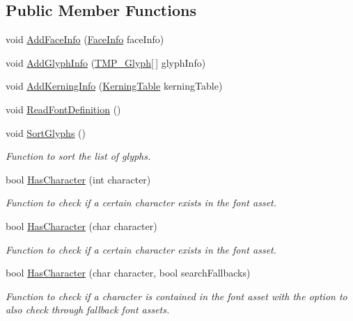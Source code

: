 \subsection*{Public Member Functions}
\begin{DoxyCompactItemize}
\item 
void \mbox{\hyperlink{class_t_m_pro_1_1_t_m_p___font_asset_a8189329802859389f3dd6152b4f9917f}{Add\+Face\+Info}} (\mbox{\hyperlink{class_t_m_pro_1_1_face_info}{Face\+Info}} face\+Info)
\item 
void \mbox{\hyperlink{class_t_m_pro_1_1_t_m_p___font_asset_a6002e55fa6fdd78bbc65dac68e9f9192}{Add\+Glyph\+Info}} (\mbox{\hyperlink{class_t_m_pro_1_1_t_m_p___glyph}{T\+M\+P\+\_\+\+Glyph}}\mbox{[}$\,$\mbox{]} glyph\+Info)
\item 
void \mbox{\hyperlink{class_t_m_pro_1_1_t_m_p___font_asset_a45942ff82434c0e1e07f830b1d0c2af0}{Add\+Kerning\+Info}} (\mbox{\hyperlink{class_t_m_pro_1_1_kerning_table}{Kerning\+Table}} kerning\+Table)
\item 
void \mbox{\hyperlink{class_t_m_pro_1_1_t_m_p___font_asset_aecaed95f724698d0c77f8d38eab90640}{Read\+Font\+Definition}} ()
\item 
void \mbox{\hyperlink{class_t_m_pro_1_1_t_m_p___font_asset_a65d62154e56cd5bde1da7a8f9a183f5d}{Sort\+Glyphs}} ()
\begin{DoxyCompactList}\small\item\em Function to sort the list of glyphs. \end{DoxyCompactList}\item 
bool \mbox{\hyperlink{class_t_m_pro_1_1_t_m_p___font_asset_a10751e4fd6f455aa72ae50f688d0698a}{Has\+Character}} (int character)
\begin{DoxyCompactList}\small\item\em Function to check if a certain character exists in the font asset. \end{DoxyCompactList}\item 
bool \mbox{\hyperlink{class_t_m_pro_1_1_t_m_p___font_asset_a2666ef452a0079b5595353c91b94bf3e}{Has\+Character}} (char character)
\begin{DoxyCompactList}\small\item\em Function to check if a certain character exists in the font asset. \end{DoxyCompactList}\item 
bool \mbox{\hyperlink{class_t_m_pro_1_1_t_m_p___font_asset_ab31b4d104cf7a6e0776a98d4d9c7ffee}{Has\+Character}} (char character, bool search\+Fallbacks)
\begin{DoxyCompactList}\small\item\em Function to check if a character is contained in the font asset with the option to also check through fallback font assets. \end{DoxyCompactList}\item 

\end{DoxyCompactItemize}
